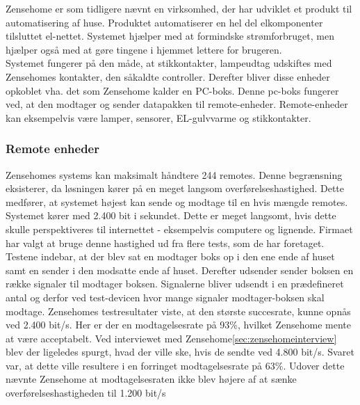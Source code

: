 \label{sec:zensehome}
Zensehome er som tidligere nævnt en virksomhed, der har udviklet et produkt til automatisering af huse. Produktet automatiserer en hel del elkomponenter tilsluttet el-nettet.
Systemet hjælper med at formindske strømforbruget, men hjælper også med at gøre tingene i hjemmet lettere for brugeren. \\
Systemet fungerer på den måde, at stikkontakter, lampeudtag udskiftes med Zensehomes kontakter, den såkaldte controller. Derefter bliver disse enheder opkoblet vha. det som Zensehome kalder en PC-boks. Denne pc-boks fungerer ved, at den modtager og sender datapakken til remote-enheder. Remote-enheder kan eksempelvis være lamper, sensorer, EL-gulvvarme og stikkontakter.
\subsubsection{Remote enheder}
Zensehomes systems kan maksimalt håndtere 244 remotes. Denne begrænsning eksisterer, da løsningen kører på en meget langsom overførelseshastighed. Dette medfører, at systemet højest kan sende og modtage til en hvis mængde remotes.
Systemet kører med 2.400 bit i sekundet. Dette er meget langsomt, hvis dette skulle perspektiveres til internettet - eksempelvis computere og lignende.
Firmaet har valgt at bruge denne hastighed ud fra flere tests, som de har foretaget. Testene indebar, at der blev sat en modtager boks op i den ene ende af huset samt en sender i den modsatte ende af huset. 
Derefter udsender sender boksen en række signaler til modtager boksen. Signalerne bliver udsendt i en prædefineret antal og derfor ved test-devicen hvor mange signaler modtager-boksen skal modtage.
Zensehomes testresultater viste, at den største succesrate, kunne opnås ved 2.400 bit/s. Her er der en modtagelsesrate på 93\%, hvilket Zensehome mente at være acceptabelt. Ved interviewet med Zensehome\ref{sec:zensehomeinterview} blev der ligeledes spurgt, hvad der ville ske, hvis de sendte ved 4.800 bit/s. Svaret var, at dette ville resultere i en forringet modtagelsesrate på 63\%. Udover dette nævnte Zensehome at modtagelsesraten ikke blev højere af at sænke overførelseshastigheden til 1.200 bit/s
